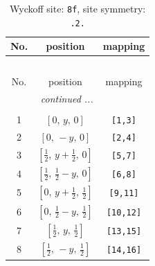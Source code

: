 \documentclass[fleqn,8pt]{jsarticle}
\begin{document}
\begin{longtable}{ccc}
\caption{Wyckoff site: {\tt 8f}, site symmetry: {\tt .2.}}
 \\
 \hline \hline
No. & position & mapping \\ \hline \endfirsthead

\multicolumn{2}{l}{\tablename\ \thetable{}} \\
 \hline \hline
No. & position & mapping \\ \hline \endhead

 \hline \hline
\multicolumn{2}{r}{\footnotesize\it continued ...} \\ \endfoot

 \hline \hline
\multicolumn{2}{r}{} \\ \endlastfoot

1 & $\left[ 0,\, y,\, 0 \right]$ & {\tt [1,3]} \\ \hline
2 & $\left[ 0,\, - y,\, 0 \right]$ & {\tt [2,4]} \\ \hline
3 & $\left[ \frac{1}{2},\, y + \frac{1}{2},\, 0 \right]$ & {\tt [5,7]} \\ \hline
4 & $\left[ \frac{1}{2},\, \frac{1}{2} - y,\, 0 \right]$ & {\tt [6,8]} \\ \hline
5 & $\left[ 0,\, y + \frac{1}{2},\, \frac{1}{2} \right]$ & {\tt [9,11]} \\ \hline
6 & $\left[ 0,\, \frac{1}{2} - y,\, \frac{1}{2} \right]$ & {\tt [10,12]} \\ \hline
7 & $\left[ \frac{1}{2},\, y,\, \frac{1}{2} \right]$ & {\tt [13,15]} \\ \hline
8 & $\left[ \frac{1}{2},\, - y,\, \frac{1}{2} \right]$ & {\tt [14,16]} \\
\end{longtable}
\renewcommand{\arraystretch}{1.2}
\end{document}

